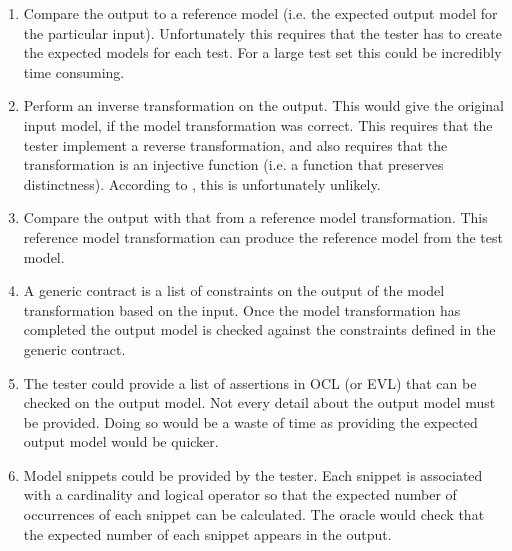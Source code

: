 \begin{enumerate}
	\item Compare the output to a reference model (i.e. the expected output model for the particular input). Unfortunately this requires that the tester has to create the expected models for each test. For a large test set this could be incredibly time consuming.
	\item Perform an inverse transformation on the output. This would give the original input model, if the model transformation was correct. This requires that the tester implement a reverse transformation, and also requires that the transformation is an injective function (i.e. a function that preserves distinctness). According to \citet{mttOracleIssue}, this is unfortunately unlikely.
	\item Compare the output with that from a reference model transformation. This reference model transformation can produce the reference model from the test model. 
	\item A generic contract is a list of constraints on the output of the model transformation based on the input. Once the model transformation has completed the output model is checked against the constraints defined in the generic contract.
	\item The tester could provide a list of assertions in OCL (or EVL) that can be checked on the output model. Not every detail about the output model must be provided. Doing so would be a waste of time as providing the expected output model would be quicker.
	\item Model snippets could be provided by the tester. Each snippet is associated with a cardinality and logical operator so that the expected number of occurrences of each snippet can be calculated. The oracle would check that the expected number of each snippet appears in the output. 
\end{enumerate}





% 
